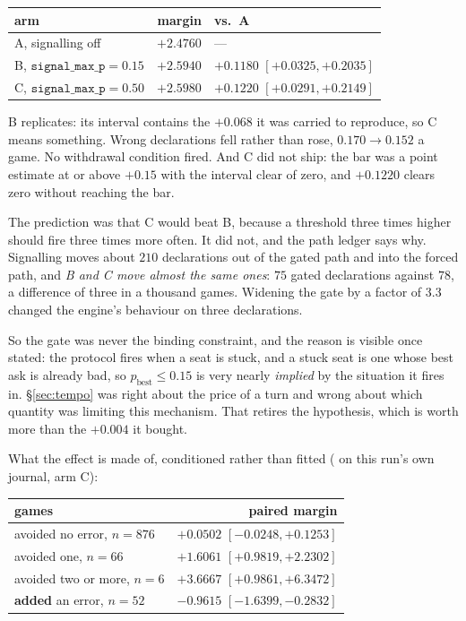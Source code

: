 \documentclass[11pt,letterpaper]{article}
\begin{document}
\begin{center}
\small
\begin{tabular}{lrl}
\toprule
arm & margin & vs.\ A \\
\midrule
A, signalling off & $+2.4760$ & --- \\
B, $\texttt{signal\_max\_p} = 0.15$ & $+2.5940$ & $+0.1180$ $[+0.0325, +0.2035]$ \\
C, $\texttt{signal\_max\_p} = 0.50$ & $+2.5980$ & $+0.1220$ $[+0.0291, +0.2149]$ \\
\bottomrule
\end{tabular}
\end{center}

B replicates: its interval contains the $+0.068$ it was carried to reproduce,
so C means something. Wrong declarations fell rather than rose, $0.170 \to
0.152$ a game. No withdrawal condition fired. And C did not ship: the bar was a
point estimate at or above $+0.15$ with the interval clear of zero, and
$+0.1220$ clears zero without reaching the bar.

The prediction was that C would beat B, because a threshold three times higher
should fire three times more often. It did not, and the path ledger says
why. Signalling moves about $210$ declarations out of the gated path and into
the forced path, and \emph{B and C move almost the same ones}: $75$ gated
declarations against $78$, a difference of three in a thousand games. Widening
the gate by a factor of $3.3$ changed the engine's behaviour on three
declarations.

So the gate was never the binding constraint, and the reason is visible once
stated: the protocol fires when a seat is stuck, and a stuck seat is one whose
best ask is already bad, so $p_{\text{best}} \leq 0.15$ is very nearly
\emph{implied} by the situation it fires in. \S\ref{sec:tempo} was right about
the price of a turn and wrong about which quantity was limiting this mechanism.
That retires the hypothesis, which is worth more than the $+0.004$ it bought.

What the effect is made of, conditioned rather than fitted
( on this run's own journal, arm C):

\begin{center}
\small
\begin{tabular}{lr}
\toprule
games & paired margin \\
\midrule
avoided no error, $n = 876$ & $+0.0502$ $[-0.0248, +0.1253]$ \\
avoided one, $n = 66$ & $+1.6061$ $[+0.9819, +2.2302]$ \\
avoided two or more, $n = 6$ & $+3.6667$ $[+0.9861, +6.3472]$ \\
\textbf{added} an error, $n = 52$ & $-0.9615$ $[-1.6399, -0.2832]$ \\
\bottomrule
\end{tabular}
\end{center}
\end{document}
